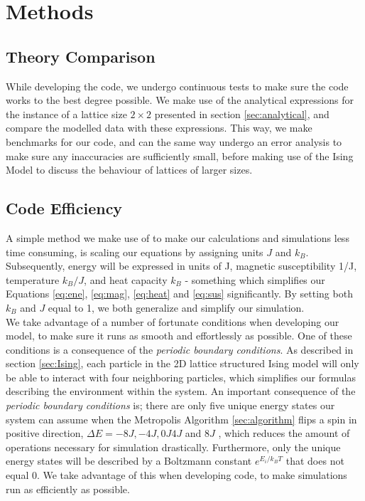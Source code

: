 \documentclass[10pt, nofootinbib, twocolumn]{revtex4-1}
\begin{document}
\newpage 
\section{Methods}\label{sec:methods} 
\subsection{Theory Comparison}
While developing the code, we undergo continuous tests to make sure the code works to the best degree possible. We make use of the analytical expressions for the instance of a lattice size $2\times 2$ presented in section \ref{sec:analytical}, and compare the modelled data with these expressions. This way, we make benchmarks for our code, and can the same way undergo an error analysis to make sure any inaccuracies are sufficiently small, before making use of the Ising Model to discuss the behaviour of lattices of larger sizes. 


\subsection{Code Efficiency}
A simple method we make use of to make our calculations and simulations less time consuming, is scaling our equations by assigning units $J$ and $k_B$. Subsequently, energy will be expressed in units of J, magnetic susceptibility 1/J, temperature $k_B/J$, and heat capacity $k_B$ - something which simplifies our Equations \ref{eq:ene}, \ref{eq:mag}, \ref{eq:heat} and \ref{eq:sus} significantly. By setting both $k_B$ and $J$ equal to 1, we both generalize and simplify our simulation. \\

We take advantage of a number of fortunate conditions when developing our model, to make sure it runs as smooth and effortlessly as possible. One of these conditions is a consequence of the \textit{periodic boundary conditions}. As described in section \ref{sec:Ising}, each particle in the 2D lattice structured Ising model will only be able to interact with four neighboring particles, which simplifies our formulas describing the environment within the system. An important consequence of the \textit{periodic boundary conditions} is; there are only five unique energy states our system can assume when the Metropolis Algorithm \ref{sec:algorithm} flips a spin in positive direction, $\Delta E = -8J, -4J, 0J 4J$ and $8J$ \cite[p.~436]{notes}, which reduces the amount of operations necessary for simulation drastically. Furthermore, only the unique energy states will be described by a Boltzmann constant $e^{E_i/k_BT}$ that does not equal 0. We take advantage of this when developing code, to make simulations run as efficiently as possible. \\
\end{document}

